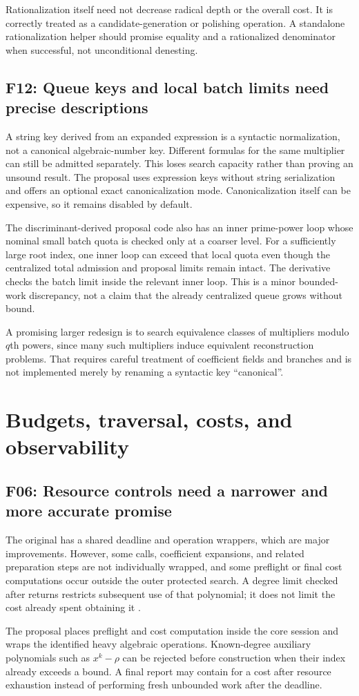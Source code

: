 \documentclass[11pt,letterpaper]{article}
\numberwithin{equation}{section}
\theoremstyle{definition}\newtheorem{definition}[theorem]{Definition}
\theoremstyle{remark}\newtheorem{remark}[theorem]{Remark}
\newcommand{\code}[1]{\texttt{\detokenize{#1}}}
\newcommand{\finding}[2]{\subsection{#1: #2}}
\begin{document}
Rationalization itself need not decrease radical depth or the overall cost. It is correctly treated as a candidate-generation or polishing operation. A standalone rationalization helper should promise equality and a rationalized denominator when successful, not unconditional denesting.

\finding{F12}{Queue keys and local batch limits need precise descriptions}
A string key derived from an expanded expression is a syntactic normalization, not a canonical algebraic-number key. Different formulas for the same multiplier can still be admitted separately. This loses search capacity rather than proving an unsound result. The proposal uses expression keys without string serialization and offers an optional exact canonicalization mode. Canonicalization itself can be expensive, so it remains disabled by default.

The discriminant-derived proposal code also has an inner prime-power loop whose nominal small batch quota is checked only at a coarser level. For a sufficiently large root index, one inner loop can exceed that local quota even though the centralized total admission and proposal limits remain intact. The derivative checks the batch limit inside the relevant inner loop. This is a minor bounded-work discrepancy, not a claim that the already centralized queue grows without bound.

A promising larger redesign is to search equivalence classes of multipliers modulo $q$th powers, since many such multipliers induce equivalent reconstruction problems. That requires careful treatment of coefficient fields and branches and is not implemented merely by renaming a syntactic key ``canonical''.

\section{Budgets, traversal, costs, and observability}
\finding{F06}{Resource controls need a narrower and more accurate promise}
The original has a shared deadline and operation wrappers, which are major improvements. However, some \code{FactorInteger} calls, coefficient expansions, and related preparation steps are not individually wrapped, and some preflight or final cost computations occur outside the outer protected search. A degree limit checked after \code{MinimalPolynomial} returns restricts subsequent use of that polynomial; it does not limit the cost already spent obtaining it \cite{source}.

The proposal places preflight and cost computation inside the core session and wraps the identified heavy algebraic operations. Known-degree auxiliary polynomials such as $x^k-\rho$ can be rejected before construction when their index already exceeds a bound. A final report may contain \code{Missing["NotComputed"]} for a cost after resource exhaustion instead of performing fresh unbounded work after the deadline.
\end{document}
